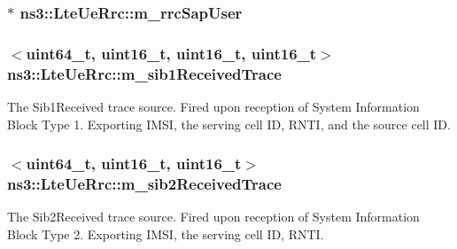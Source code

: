 \subsubsection[{\texorpdfstring{m\+\_\+rrc\+Sap\+User}{m_rrcSapUser}}]{$\ast$ ns3\+::\+Lte\+Ue\+Rrc\+::m\+\_\+rrc\+Sap\+User\hspace{0.3cm}{\ttfamily [private]}}\hypertarget{classns3_1_1LteUeRrc_a9636e38d20aa1d75c9423d43648f2a1a}{}\label{classns3_1_1LteUeRrc_a9636e38d20aa1d75c9423d43648f2a1a}
\subsubsection[{\texorpdfstring{m\+\_\+sib1\+Received\+Trace}{m_sib1ReceivedTrace}}]{$<$uint64\+\_\+t, uint16\+\_\+t, uint16\+\_\+t, uint16\+\_\+t$>$ ns3\+::\+Lte\+Ue\+Rrc\+::m\+\_\+sib1\+Received\+Trace\hspace{0.3cm}{\ttfamily [private]}}\hypertarget{classns3_1_1LteUeRrc_a6c744274b24e206588a34dc05ca983ff}{}\label{classns3_1_1LteUeRrc_a6c744274b24e206588a34dc05ca983ff}
The {\ttfamily Sib1\+Received} trace source. Fired upon reception of System Information Block Type 1. Exporting I\+M\+SI, the serving cell ID, R\+N\+TI, and the source cell ID. 
\subsubsection[{\texorpdfstring{m\+\_\+sib2\+Received\+Trace}{m_sib2ReceivedTrace}}]{$<$uint64\+\_\+t, uint16\+\_\+t, uint16\+\_\+t$>$ ns3\+::\+Lte\+Ue\+Rrc\+::m\+\_\+sib2\+Received\+Trace\hspace{0.3cm}{\ttfamily [private]}}\hypertarget{classns3_1_1LteUeRrc_a9fc4a1a9138bae6f5192d0b716ca3da0}{}\label{classns3_1_1LteUeRrc_a9fc4a1a9138bae6f5192d0b716ca3da0}
The {\ttfamily Sib2\+Received} trace source. Fired upon reception of System Information Block Type 2. Exporting I\+M\+SI, the serving cell ID, R\+N\+TI. 
